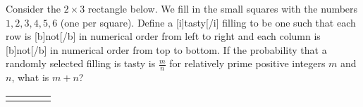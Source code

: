 Consider the $2\times3$ rectangle below. We fill in the small squares with the numbers $1,2,3,4,5,6$ (one per square). Define a [i]tasty[/i] filling to be one such that each row is [b]not[/b] in numerical order from left to right and each column is [b]not[/b] in numerical order from top to bottom. If the probability that a randomly selected filling is tasty is $\frac{m}{n}$ for relatively prime positive integers $m$ and $n$, what is $m+n$?

    \begin{tabular}{|c|c|c|c|}
    \hline
          &   &  \\ \hline
          &   &  \\ \hline
    \end{tabular}